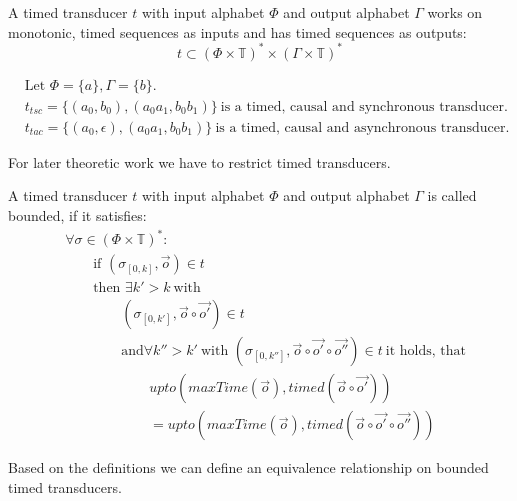 \begin{definition}[name = Timed Transducer]\label{def:timed_transducer}
  A timed transducer \(t\) with input alphabet \(\Phi\) and output alphabet \(\Gamma\) works on monotonic, timed sequences as inputs and has timed sequences as outputs:
  \[t \subset {\left(\Phi \times \mathbb{T}\right)}^* \times {\left(\Gamma \times \mathbb{T}\right)}^*\]
\end{definition}

\begin{exmp}[name=Timed Transducers]
  \begin{align*}
    &\text{Let } \Phi = \{a\}, \Gamma = \{b\}.\\
    &t_{tsc} = \{(a_0, b_0),(a_0a_1, b_0b_1)\}\ \text{is a timed, causal and synchronous transducer.}\\
    &t_{tac} = \{(a_0, \epsilon),(a_0a_1, b_0b_1)\}\ \text{is a timed, causal and asynchronous transducer.}
  \end{align*}
\end{exmp}

For later theoretic work we have to restrict timed transducers.

\begin{definition}[name = Boundedness of Timed Transducers]\label{def:boundedness_timed_transducer}
  A timed transducer \(t\) with input alphabet \(\Phi\) and output alphabet \(\Gamma\) is called bounded, if it satisfies:
  \begin{align*}
    &\forall \sigma \in {(\Phi \times \mathbb{T})}^*:\\
    &\hspace{2em}\text{if } (\sigma_{[0,k]}, \vec{o}) \in t\\
    &\hspace{2em}\text{then }\exists k' > k\ \text{with}\\
    &\hspace{4em}(\sigma_{[0,k']}, \vec{o} \circ \vec{o'}) \in t\\
    &\hspace{4em}\text{and} \forall k'' > k'\ \text{with } (\sigma_{[0,k'']}, \vec{o}\circ\vec{o'}\circ\vec{o''}) \in t\ \text{it holds, that}\\
    &\hspace{6em}\mathit{upto}(\mathit{maxTime}(\vec{o}), \mathit{timed}(\vec{o}\circ\vec{o'}))  \\
    &\hspace{6em}= \mathit{upto}(\mathit{maxTime}(\vec{o}), \mathit{timed}(\vec{o}\circ\vec{o'}\circ\vec{o''}))
  \end{align*}
\end{definition}
Based on the definitions we can define an equivalence relationship on bounded timed transducers.

